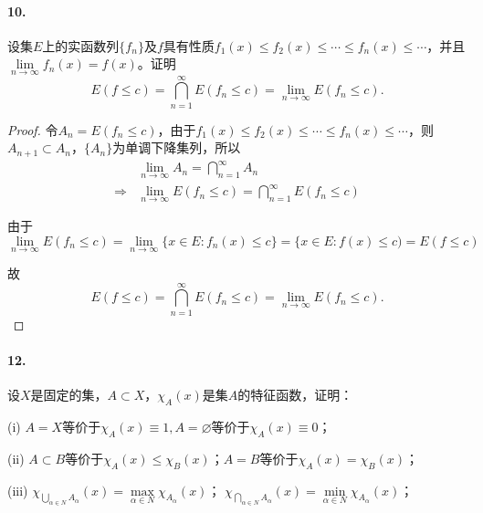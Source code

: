 \documentclass[12pt, a4paper, oneside]{ctexart}
\begin{document}
\paragraph{10.}设集$E$上的实函数列$\{f_n\}$及$f$具有性质$f_1(x)\leqslant f_2(x)\leqslant \cdots \leqslant f_n(x)\leqslant \cdots$，并且$\lim\limits_{n\rightarrow \infty}f_n(x)=f(x)$。证明
\begin{equation*}
    E(f\leqslant c)=\bigcap_{n=1}^{\infty}E(f_n\leqslant c)=\lim_{n\rightarrow \infty}E(f_n\leqslant c).
\end{equation*}
\begin{proof}
    令$A_n = E(f_n\leqslant c)$，由于$f_1(x)\leqslant f_2(x)\leqslant \cdots \leqslant f_n(x)\leqslant \cdots$，则$A_{n+1}\subset A_n$，$\{A_n\}$为单调下降集列，所以
    \begin{equation*}
        \begin{aligned}
            &\lim_{n\rightarrow\infty}A_n=\bigcap_{n=1}^{\infty}A_n\\
            \Rightarrow&\lim_{n\rightarrow\infty}E(f_n\leqslant c)=\bigcap_{n=1}^{\infty}E(f_n\leqslant c)
        \end{aligned}
    \end{equation*}
    
    由于
    \begin{equation*}
        \lim_{n\rightarrow \infty}E(f_n\leqslant c) = \lim_{n\rightarrow \infty}\{x\in E:f_n(x)\leqslant c\}=\{x\in E:f(x)\leqslant c)=E(f\leqslant c)
    \end{equation*}

    故
    \begin{equation*}
        E(f\leqslant c)=\bigcap_{n=1}^{\infty}E(f_n\leqslant c)=\lim_{n\rightarrow \infty}E(f_n\leqslant c).
    \end{equation*}
\end{proof}

\paragraph{12.}设$X$是固定的集，$A\subset X$，$\chi_A(x)$是集$A$的特征函数，证明：

(i) $A=X$等价于$\chi_A(x)\equiv 1,A=\varnothing$等价于$\chi_A(x)\equiv 0$；

(ii) $A\subset B$等价于$\chi_A(x)\leqslant \chi_B(x)$；$A=B$等价于$\chi_A(x)=\chi_B(x)$；

(iii) $\chi_{\bigcup\limits_{\alpha\in N}A_{\alpha}}(x) = \max\limits_{\alpha\in N}\chi_{A_{\alpha}}(x)$；
$\chi_{\bigcap\limits_{\alpha\in N}A_{\alpha}}(x) = \min\limits_{\alpha\in N}\chi_{A_{\alpha}}(x)$；
\end{document}
